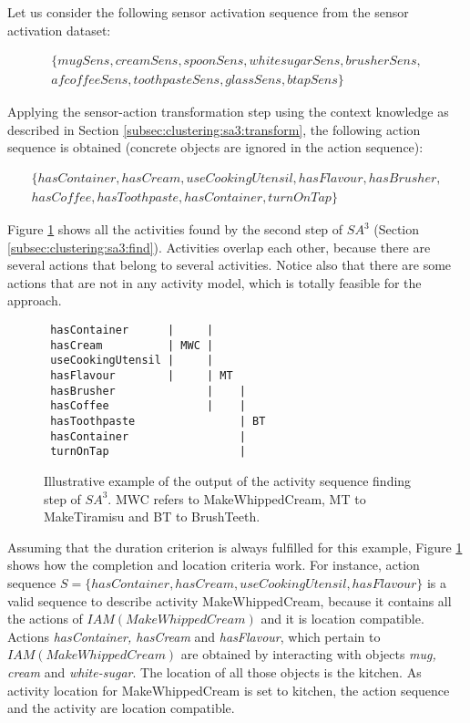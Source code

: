 Let us consider the following sensor activation sequence from the sensor activation dataset:

\begin{equation*}
\begin{split}
 \{mugSens, creamSens, spoonSens, whitesugarSens, brusherSens, \\ 
 afcoffeeSens, toothpasteSens, glassSens, btapSens\}
\end{split}  
\end{equation*}

Applying the sensor-action transformation step using the context knowledge as described in Section \ref{subsec:clustering:sa3:transform}, the following action sequence is obtained (concrete objects are ignored in the action sequence):

\begin{equation*}
\begin{split}
 \{hasContainer, hasCream, useCookingUtensil, hasFlavour, hasBrusher, \\ 
 hasCoffee, hasToothpaste, hasContainer, turnOnTap\}
\end{split}  
\end{equation*}

Figure \ref{fig:overlap-l} shows all the activities found by the second step of $SA^3$ (Section \ref{subsec:clustering:sa3:find}). Activities overlap each other, because there are several actions that belong to several activities. Notice also that there are some actions that are not in any activity model, which is totally feasible for the approach.

\begin{figure}[htbp]
 \begin{small}
\begin{lstlisting}
 hasContainer      |     |
 hasCream          | MWC |
 useCookingUtensil |     |
 hasFlavour        |     | MT 
 hasBrusher              |    |
 hasCoffee               |    |
 hasToothpaste                | BT
 hasContainer                 |
 turnOnTap                    |
\end{lstlisting}
\caption{Illustrative example of the output of the activity sequence finding step of $SA^3$. MWC refers to MakeWhippedCream, MT to MakeTiramisu  and BT to BrushTeeth.}
\label{fig:overlap-l}
\end{small}
\end{figure}

Assuming that the duration criterion is always fulfilled for this example, Figure \ref{fig:overlap-l} shows how the completion and location criteria work. For instance, action sequence $S = \{hasContainer, hasCream, useCookingUtensil, hasFlavour\}$ is a valid sequence to describe activity MakeWhippedCream, because it contains all the actions of $IAM(MakeWhippedCream)$ and it is location compatible. Actions \textit{hasContainer, hasCream} and \textit{hasFlavour}, which pertain to $IAM(MakeWhippedCream)$ are obtained by interacting with objects \textit{mug, cream} and \textit{white-sugar}. The location of all those objects is the kitchen. As activity location for MakeWhippedCream is set to kitchen, the action sequence and the activity are location compatible.

